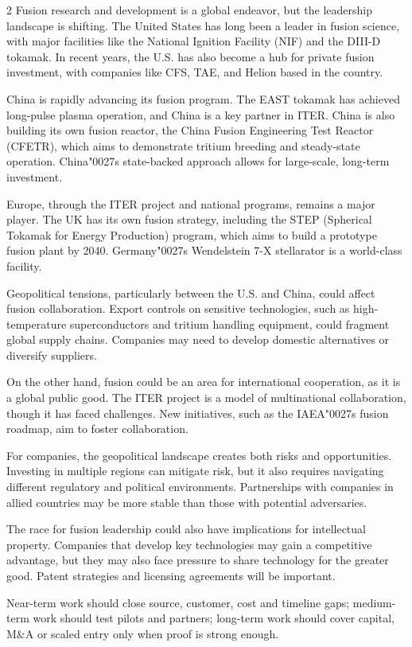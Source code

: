 \documentclass[10pt,a4paper]{article}
\newcommand{\BOApos}{{\BOQuoteFont\char"0027}}
\begin{document}
\begin{multicols}{2}
{\small Fusion research and development is a global endeavor, but the leadership landscape is shifting. The United States has long been a leader in fusion science, with major facilities like the National Ignition Facility (NIF) and the DIII-D tokamak. In recent years, the U.S. has also become a hub for private fusion investment, with companies like CFS, TAE, and Helion based in the country.}\par
{\small China is rapidly advancing its fusion program. The EAST tokamak has achieved long-pulse plasma operation, and China is a key partner in ITER. China is also building its own fusion reactor, the China Fusion Engineering Test Reactor (CFETR), which aims to demonstrate tritium breeding and steady-state operation. China\BOApos{}s state-backed approach allows for large-scale, long-term investment.}\par
{\small Europe, through the ITER project and national programs, remains a major player. The UK has its own fusion strategy, including the STEP (Spherical Tokamak for Energy Production) program, which aims to build a prototype fusion plant by 2040. Germany\BOApos{}s Wendelstein 7-X stellarator is a world-class facility.}\par
{\small Geopolitical tensions, particularly between the U.S. and China, could affect fusion collaboration. Export controls on sensitive technologies, such as high-temperature superconductors and tritium handling equipment, could fragment global supply chains. Companies may need to develop domestic alternatives or diversify suppliers.}\par
{\small On the other hand, fusion could be an area for international cooperation, as it is a global public good. The ITER project is a model of multinational collaboration, though it has faced challenges. New initiatives, such as the IAEA\BOApos{}s fusion roadmap, aim to foster collaboration.}\par
{\small For companies, the geopolitical landscape creates both risks and opportunities. Investing in multiple regions can mitigate risk, but it also requires navigating different regulatory and political environments. Partnerships with companies in allied countries may be more stable than those with potential adversaries.}\par
{\small The race for fusion leadership could also have implications for intellectual property. Companies that develop key technologies may gain a competitive advantage, but they may also face pressure to share technology for the greater good. Patent strategies and licensing agreements will be important.}\par
{\small Near-term work should close source, customer, cost and timeline gaps; medium-term work should test pilots and partners; long-term work should cover capital, M\&A or scaled entry only when proof is strong enough.}\par
\end{multicols}
\end{document}
